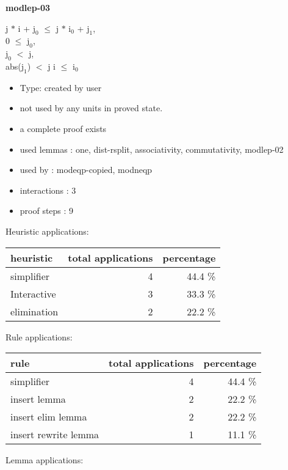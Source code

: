 \documentclass[a4paper]{article}
\begin{document}
{\LARGE\bf modlep-03}\label{lemma-modlep-03}

\medskip

j $*$ i + $\mbox{j}_{0}$ $\le$ j $*$ $\mbox{i}_{0}$ + $\mbox{j}_{1}$, \\
0 $\le$ $\mbox{j}_{0}$, \\
$\mbox{j}_{0}$ $<$ j, \\
abs($\mbox{j}_{1}$) $<$ j \Fol i $\le$ $\mbox{i}_{0}$

\begin{itemize}

\item Type: created by user

\item not used by any units in proved state.
\item       a complete proof exists
\item       used lemmas  : one, dist-rsplit, associativity, commutativity, modlep-02
\item       used by      : modeqp-copied, modneqp
\item       interactions : 3
\item       proof steps  : 9
\end{itemize}

\medskip


Heuristic applications:

\begin{supertabular}{l|r|r}
heuristic	& total applications & percentage \\ \hline
simplifier & 4 & 44.4 \% \\
Interactive & 3 & 33.3 \% \\
elimination & 2 & 22.2 \% \\

\end{supertabular}

Rule applications:

\begin{supertabular}{l|r|r}
rule	        & total applications & percentage \\ \hline
simplifier & 4 & 44.4 \% \\
insert lemma & 2 & 22.2 \% \\
insert elim lemma & 2 & 22.2 \% \\
insert rewrite lemma & 1 & 11.1 \% \\

\end{supertabular}

Lemma applications:
\end{document}
